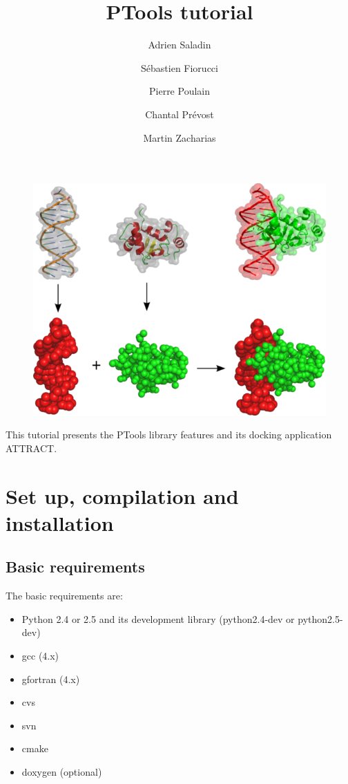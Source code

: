\documentclass[12pt,a4paper]{article}
\begin{document}
\title{\bf PTools tutorial}
\author{
Adrien Saladin \and 
S\'ebastien Fiorucci \and
Pierre Poulain \and
Chantal Pr\'evost \and
Martin Zacharias
}

\maketitle

\thispagestyle{empty}

\begin{figure}[htbp]
\center
\includegraphics*[width=0.80\linewidth]{img/docking.png}
\end{figure}


\vspace*{3cm}

\noindent
This tutorial presents the PTools library features and its docking application ATTRACT.

\newpage

\tableofcontents{}

\newpage

\section{Set up, compilation and installation}

\subsection{Basic requirements}

The basic requirements are:
\begin{itemize}
\item Python 2.4 or 2.5 and its development library (python2.4-dev or python2.5-dev)
\item gcc (4.x)
\item gfortran (4.x)
\item cvs
\item svn
\item cmake
\item doxygen (optional)
\end{itemize}
\end{document}
